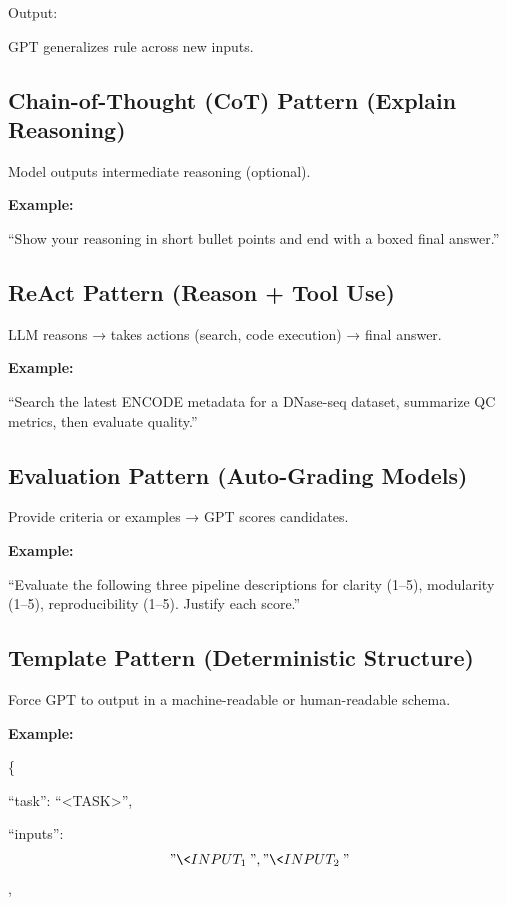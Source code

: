 \documentclass[
  letterpaper,
  DIV=11,
  numbers=noendperiod]{scrreprt}
\begin{document}
Output:

GPT generalizes rule across new inputs.

\subsection{Chain-of-Thought (CoT) Pattern (Explain
Reasoning)}\label{chain-of-thought-cot-pattern-explain-reasoning}

Model outputs intermediate reasoning (optional).

\textbf{Example:}

``Show your reasoning in short bullet points and end with a boxed final
answer.''

\subsection{ReAct Pattern (Reason + Tool
Use)}\label{react-pattern-reason-tool-use}

LLM reasons → takes actions (search, code execution) → final answer.

\textbf{Example:}

``Search the latest ENCODE metadata for a DNase-seq dataset, summarize
QC metrics, then evaluate quality.''

\subsection{Evaluation Pattern (Auto-Grading
Models)}\label{evaluation-pattern-auto-grading-models}

Provide criteria or examples → GPT scores candidates.

\textbf{Example:}

``Evaluate the following three pipeline descriptions for clarity (1--5),
modularity (1--5), reproducibility (1--5). Justify each score.''

\subsection{Template Pattern (Deterministic
Structure)}\label{template-pattern-deterministic-structure}

Force GPT to output in a machine-readable or human-readable schema.

\textbf{Example:}

\{

``task'': ``\textless TASK\textgreater{}'',

``inputs'': \["\<INPUT_1\>", "\<INPUT_2\>"\],
\end{document}
